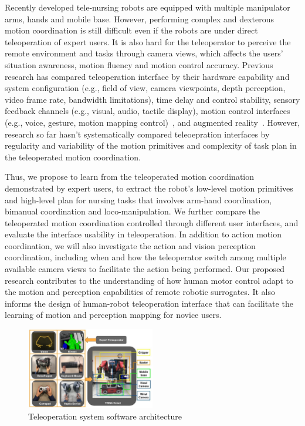 Recently developed tele-nursing robots \cite{Li2017} are equipped with multiple manipulator arms, hands and mobile base. However, performing complex and dexterous motion coordination is still difficult even if the robots are under direct teleoperation of expert users. It is also hard for the teleoperator to perceive the remote environment and tasks through camera views, which affects the users' situation awareness, motion fluency and motion control accuracy. Previous research has compared teleoperation interface by their hardware capability and system configuration (e.g., field of view, camera viewpoints, depth perception, video frame rate, bandwidth limitations), time delay and control stability, sensory feedback channels (e.g., visual, audio, tactile display), motion control interfaces (e.g., voice, gesture, motion mapping control)~\cite{chen07, Zhu11,Luis14}, and augmented reality~\cite{Fritsche15,Garcia17,Peppoloni15,Brizzi18}. However, research so far hasn't systematically compared teleoepration interfaces by regularity and variability of the motion primitives and complexity of task plan in the teleoperated motion coordination.

Thus, we propose to learn from the teleoperated motion coordination demonstrated by expert users, to extract the robot's low-level motion primitives and high-level plan for nursing tasks that involves arm-hand coordination, bimanual coordination and loco-manipulation. We further compare the teleoperated motion coordination controlled through different user interfaces, and evaluate the interface usability in teleoperation. In addition to action motion coordination, we will also investigate the action and vision perception coordination, including when and how the teleoperator switch among multiple available camera views to facilitate the action being performed. Our proposed research contributes to the understanding of how human motor control adapt to the motion and perception capabilities of remote robotic surrogates. It also informs the design of human-robot teleoperation interface that can facilitate the learning of motion and perception mapping for novice users. 

\begin{figure}
\centering
\includegraphics[width=0.5\textwidth]{fig//TeleInterface}
\caption{Teleoperation system software architecture}
\label{fig:TeleInterface}
\vspace{0.5ex}
\end{figure}


